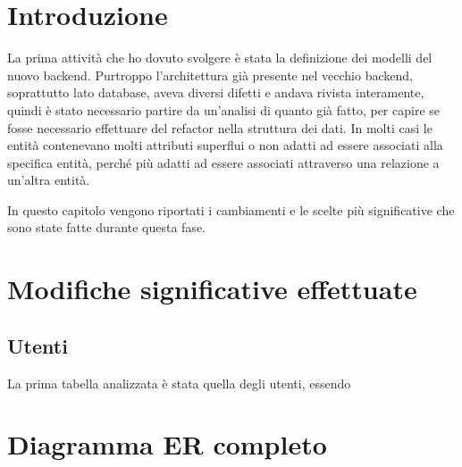 \section{Introduzione}
La prima attività che ho dovuto svolgere è stata la definizione dei modelli del nuovo backend. Purtroppo l'architettura già presente nel vecchio backend, soprattutto lato database, aveva diversi difetti e andava rivista interamente, quindi è stato necessario partire da un'analisi di quanto già fatto, per capire se fosse necessario effettuare del refactor nella struttura dei dati. In molti casi le entità contenevano molti attributi superflui o non adatti ad essere associati alla specifica entità, perché più adatti ad essere associati attraverso una relazione a un'altra entità.

In questo capitolo vengono riportati i cambiamenti e le scelte più significative che sono state fatte durante questa fase.

\section{Modifiche significative effettuate}
\subsection{Utenti}
La prima tabella analizzata è stata quella degli utenti, essendo 

\section{Diagramma ER completo}
